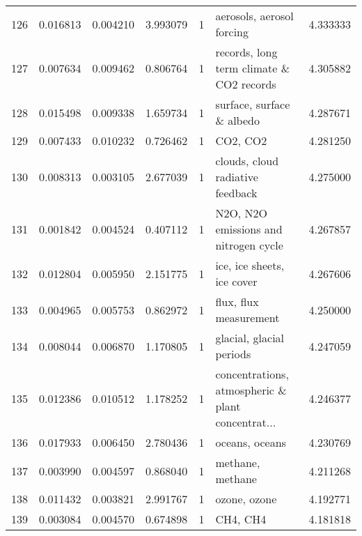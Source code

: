 \begin{tabular}{lrrrrlr}
126 &    0.016813 &  0.004210 &        3.993079 &           1 &                          aerosols, aerosol forcing &  4.333333 \\
127 &    0.007634 &  0.009462 &        0.806764 &           1 &           records, long term climate \& CO2 records &  4.305882 \\
128 &    0.015498 &  0.009338 &        1.659734 &           1 &                          surface, surface \& albedo &  4.287671 \\
129 &    0.007433 &  0.010232 &        0.726462 &           1 &                                           CO2, CO2 &  4.281250 \\
130 &    0.008313 &  0.003105 &        2.677039 &           1 &                   clouds, cloud radiative feedback &  4.275000 \\
131 &    0.001842 &  0.004524 &        0.407112 &           1 &              N2O, N2O emissions and nitrogen cycle &  4.267857 \\
132 &    0.012804 &  0.005950 &        2.151775 &           1 &                         ice, ice sheets, ice cover &  4.267606 \\
133 &    0.004965 &  0.005753 &        0.862972 &           1 &                             flux, flux measurement &  4.250000 \\
134 &    0.008044 &  0.006870 &        1.170805 &           1 &                           glacial, glacial periods &  4.247059 \\
135 &    0.012386 &  0.010512 &        1.178252 &           1 &  concentrations, atmospheric \& plant concentrat... &  4.246377 \\
136 &    0.017933 &  0.006450 &        2.780436 &           1 &                                     oceans, oceans &  4.230769 \\
137 &    0.003990 &  0.004597 &        0.868040 &           1 &                                   methane, methane &  4.211268 \\
138 &    0.011432 &  0.003821 &        2.991767 &           1 &                                       ozone, ozone &  4.192771 \\
139 &    0.003084 &  0.004570 &        0.674898 &           1 &                                           CH4, CH4 &  4.181818 \\
\bottomrule
\end{tabular}
